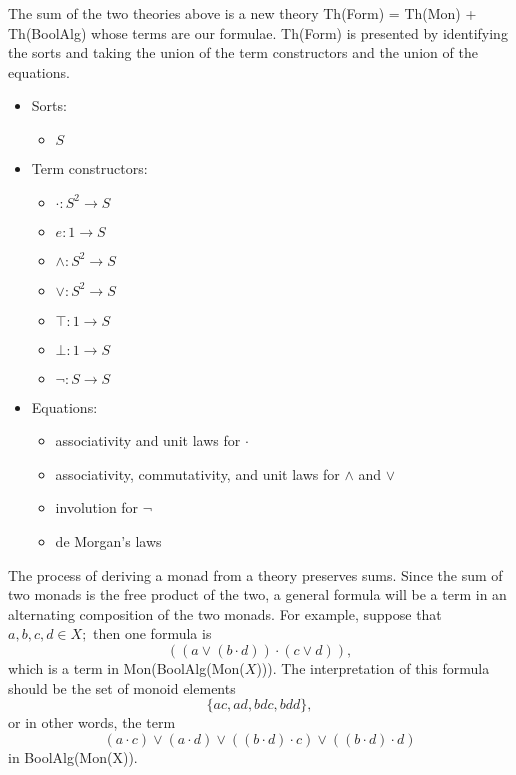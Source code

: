\documentclass{article}
\newcommand{\maps}{\colon}
\begin{document}
The sum of the two theories above is a new theory Th(Form) = Th(Mon) + Th(BoolAlg) whose terms are our formulae.  Th(Form) is presented by identifying the sorts and taking the union of the term constructors and the union of the equations.
\begin{center}
  \begin{itemize}
    \item Sorts:
    \begin{itemize}
      \item $S$
    \end{itemize}
    \item Term constructors:
    \begin{itemize}
      \item $\cdot\maps S^2 \to S$
      \item $e\maps 1 \to S$
      \item $\land\maps S^2 \to S$
      \item $\lor\maps S^2 \to S$
      \item $\top\maps 1 \to S$
      \item $\bot\maps 1 \to S$
      \item $\neg\maps S \to S$
    \end{itemize}
    \item Equations:
    \begin{itemize}
      \item associativity and unit laws for $\cdot$
      \item associativity, commutativity, and unit laws for $\land$ and $\lor$
      \item involution for $\neg$
      \item de Morgan's laws
    \end{itemize}
  \end{itemize}
\end{center}
The process of deriving a monad from a theory preserves sums.  Since the sum of two monads is the free product of the two, a general formula will be a term in an alternating composition of the two monads.  For example, suppose that $a, b, c, d \in X;$ then one formula is
\[ (({a}\lor{(b \cdot d)}) \cdot ({c}\lor{d})), \]
which is a term in Mon(BoolAlg(Mon($X$))).  The interpretation of this formula should be the set of monoid elements
\[ \{ ac, ad, bdc, bdd \}, \]
or in other words, the term
\[ (a \cdot c) \lor (a \cdot d) \lor ((b \cdot d) \cdot c) \lor ((b \cdot d) \cdot d) \]
in BoolAlg(Mon(X)).
\end{document}
